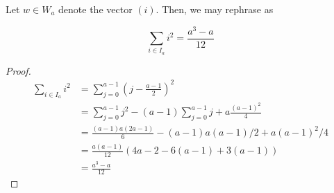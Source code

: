 
Let $w\in W_a$ denote the vector $(i)$.  Then, we may rephrase as

\begin{lemma}
$$\sum_{i\in I_a} i^2=\frac{a^3-a}{12}$$
\end{lemma}

\begin{proof}
\begin{align*}
\sum_{i\in I_a} i^2&=\sum_{j=0}^{a-1} (j-\frac{a-1}{2})^2 \\
&=\sum_{j=0}^{a-1} j^2-(a-1)\sum_{j=0}^{a-1}j+a\frac{(a-1)^2}{4} \\
&=\frac{(a-1)a(2a-1)}{6}-(a-1)a(a-1)/2+a(a-1)^2/4 \\
&=\frac{a(a-1)}{12}(4a-2-6(a-1)+3(a-1)) \\
&=\frac{a^3-a}{12}
\end{align*}
\end{proof}
           